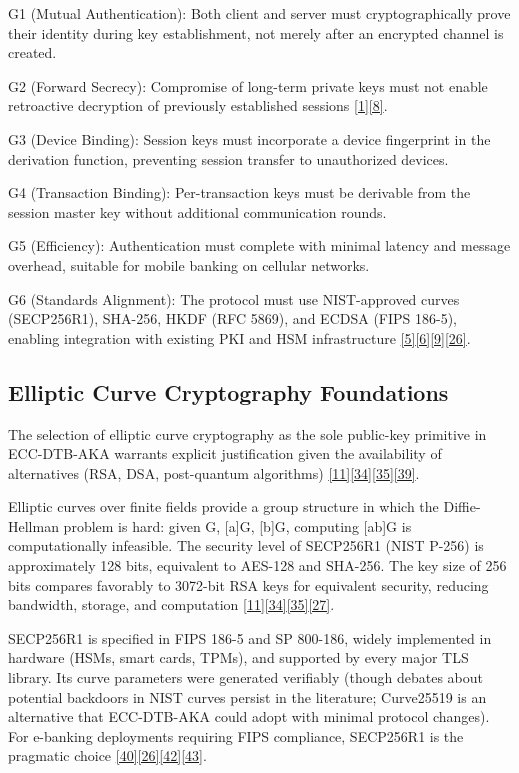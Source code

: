 \indent G1 (Mutual Authentication): Both client and server must cryptographically prove their identity during key establishment, not merely after an encrypted channel is created.

\indent G2 (Forward Secrecy): Compromise of long-term private keys must not enable retroactive decryption of previously established sessions \hyperref[ref:1]{[1]}\hyperref[ref:8]{[8]}.

\indent G3 (Device Binding): Session keys must incorporate a device fingerprint in the derivation function, preventing session transfer to unauthorized devices.

\indent G4 (Transaction Binding): Per-transaction keys must be derivable from the session master key without additional communication rounds.

\indent G5 (Efficiency): Authentication must complete with minimal latency and message overhead, suitable for mobile banking on cellular networks.

\indent G6 (Standards Alignment): The protocol must use NIST-approved curves (SECP256R1), SHA-256, HKDF (RFC 5869), and ECDSA (FIPS 186-5), enabling integration with existing PKI and HSM infrastructure \hyperref[ref:5]{[5]}\hyperref[ref:6]{[6]}\hyperref[ref:9]{[9]}\hyperref[ref:26]{[26]}.

\subsection{Elliptic Curve Cryptography Foundations}

\indent The selection of elliptic curve cryptography as the sole public-key primitive in ECC-DTB-AKA warrants explicit justification given the availability of alternatives (RSA, DSA, post-quantum algorithms) \hyperref[ref:11]{[11]}\hyperref[ref:34]{[34]}\hyperref[ref:35]{[35]}\hyperref[ref:39]{[39]}.

\indent Elliptic curves over finite fields provide a group structure in which the Diffie-Hellman problem is hard: given G, [a]G, [b]G, computing [ab]G is computationally infeasible. The security level of SECP256R1 (NIST P-256) is approximately 128 bits, equivalent to AES-128 and SHA-256. The key size of 256 bits compares favorably to 3072-bit RSA keys for equivalent security, reducing bandwidth, storage, and computation \hyperref[ref:11]{[11]}\hyperref[ref:34]{[34]}\hyperref[ref:35]{[35]}\hyperref[ref:27]{[27]}.

\indent SECP256R1 is specified in FIPS 186-5 and SP 800-186, widely implemented in hardware (HSMs, smart cards, TPMs), and supported by every major TLS library. Its curve parameters were generated verifiably (though debates about potential backdoors in NIST curves persist in the literature; Curve25519 is an alternative that ECC-DTB-AKA could adopt with minimal protocol changes). For e-banking deployments requiring FIPS compliance, SECP256R1 is the pragmatic choice \hyperref[ref:40]{[40]}\hyperref[ref:26]{[26]}\hyperref[ref:42]{[42]}\hyperref[ref:43]{[43]}.

